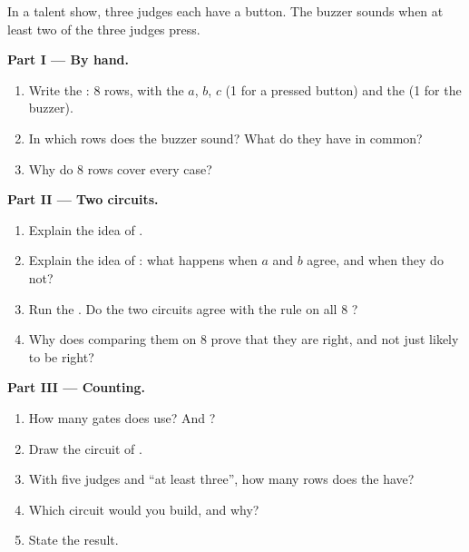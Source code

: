 \begin{problem}\label{pb:g9:logic-gates:1}
In a talent show, three judges each have a button. The buzzer sounds when at
least two of the three judges press.

\medskip\noindent\textbf{Part I --- By hand.}
\begin{enumerate}
  \item Write the : 8 rows, with the  $a$, $b$, $c$ (1 for a
    pressed button) and the  (1 for the buzzer).
  \item In which rows does the buzzer sound? What do they have in common?
  \item Why do 8 rows cover every case?
\end{enumerate}

\medskip\noindent\textbf{Part II --- Two circuits.}

\label{lst:g9:logic-gates:judges}

\begin{enumerate}[resume]
  \item Explain the idea of .
  \item Explain the idea of : what happens when $a$ and $b$
    agree, and when they do not?
  \item Run the . Do the two circuits agree with the rule on all 8
    ?
  \item Why does comparing them on 8  prove that they are right, and not
    just likely to be right?
\end{enumerate}

\medskip\noindent\textbf{Part III --- Counting.}
\begin{enumerate}[resume]
  \item How many  gates does  use? And
    ?
  \item Draw the circuit of .
  \item With five judges and ``at least three'', how many rows does the  have?
  \item Which circuit would you build, and why?
  \item State the result.
\end{enumerate}
\end{problem}
